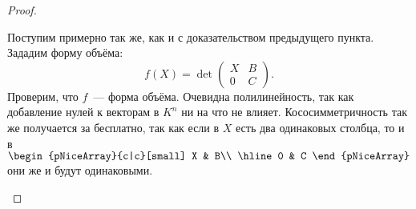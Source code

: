 \begin{proof}
\begin{enumerate}
             Поступим примерно так же, как и с доказательством предыдущего пункта. Зададим форму объёма:
             \[
                 f(X) 
                 =
                 \det \left(\begin{array}{c|c}
                     X & B\\
                     \hline
                     0 & C
                 \end{array}\right)
             .\]
             Проверим, что $f$~--- форма объёма. Очевидна полилинейность,
             так как добавление нулей к векторам в $K^n$ ни на что не влияет.
             Кососимметричность так же получается за бесплатно, так как если в 
             $X$ есть два одинаковых столбца, то и в $
             \begin{pNiceArray}{c|c}[small]
                 X & B\\
                 \hline
                 0 & C
             \end{pNiceArray}
             $ они же и будут одинаковыми.


\end{enumerate}
\end{proof}
